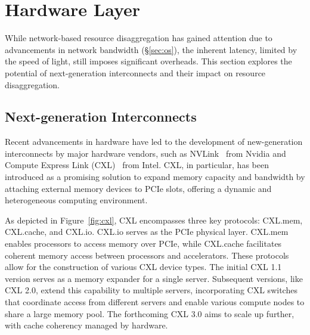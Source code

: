 \chapter{Hardware Layer}
\label{chap:hardware}
While network-based resource disaggregation has gained attention due to advancements in network bandwidth (\S\ref{sec:os}), the inherent latency, limited by the speed of light, still imposes significant overheads. This section explores the potential of next-generation interconnects and their impact on resource disaggregation.

\section{Next-generation Interconnects}

Recent advancements in hardware have led to the development of new-generation interconnects by major hardware vendors, such as NVLink~\cite{nvlink} from Nvidia and Compute Express Link (CXL)~\cite{cxl} from Intel. CXL, in particular, has been introduced as a promising solution to expand memory capacity and bandwidth by attaching external memory devices to PCIe slots, offering a dynamic and heterogeneous computing environment.

As depicted in Figure~\ref{fig:cxl}, CXL encompasses three key protocols: CXL.mem, CXL.cache, and CXL.io. CXL.io serves as the PCIe physical layer. CXL.mem enables processors to access memory over PCIe, while CXL.cache facilitates coherent memory access between processors and accelerators. These protocols allow for the construction of various CXL device types. The initial CXL 1.1 version serves as a memory expander for a single server. Subsequent versions, like CXL 2.0, extend this capability to multiple servers, incorporating CXL switches that coordinate access from different servers and enable various compute nodes to share a large memory pool. The forthcoming CXL 3.0 aims to scale up further, with cache coherency managed by hardware.

